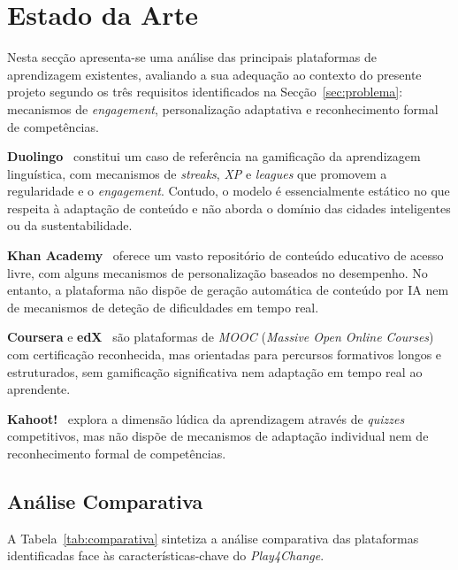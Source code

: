 \section{Estado da Arte}
\label{sec:estado_arte}

Nesta secção apresenta-se uma análise das principais plataformas de aprendizagem existentes, avaliando a sua adequação ao contexto do presente projeto segundo os três requisitos identificados na Secção~\ref{sec:problema}: mecanismos de \textit{engagement}, personalização adaptativa e reconhecimento formal de competências.

\textbf{Duolingo}~\cite{duolingo2024} constitui um caso de referência na gamificação da aprendizagem linguística, com mecanismos de \textit{streaks}, \textit{XP} e \textit{leagues} que promovem a regularidade e o \textit{engagement}. Contudo, o modelo é essencialmente estático no que respeita à adaptação de conteúdo e não aborda o domínio das cidades inteligentes ou da sustentabilidade.

\textbf{Khan Academy}~\cite{khanacademy2024} oferece um vasto repositório de conteúdo educativo de acesso livre, com alguns mecanismos de personalização baseados no desempenho. No entanto, a plataforma não dispõe de geração automática de conteúdo por IA nem de mecanismos de deteção de dificuldades em tempo real.

\textbf{Coursera} e \textbf{edX}~\cite{coursera2024,edx2024} são plataformas de \textit{MOOC} (\textit{Massive Open Online Courses}) com certificação reconhecida, mas orientadas para percursos formativos longos e estruturados, sem gamificação significativa nem adaptação em tempo real ao aprendente.

\textbf{Kahoot!}~\cite{kahoot2024} explora a dimensão lúdica da aprendizagem através de \textit{quizzes} competitivos, mas não dispõe de mecanismos de adaptação individual nem de reconhecimento formal de competências.

\subsection{Análise Comparativa}
\label{ssec:comparativa}

A Tabela~\ref{tab:comparativa} sintetiza a análise comparativa das plataformas identificadas face às características-chave do \textit{Play4Change}.

